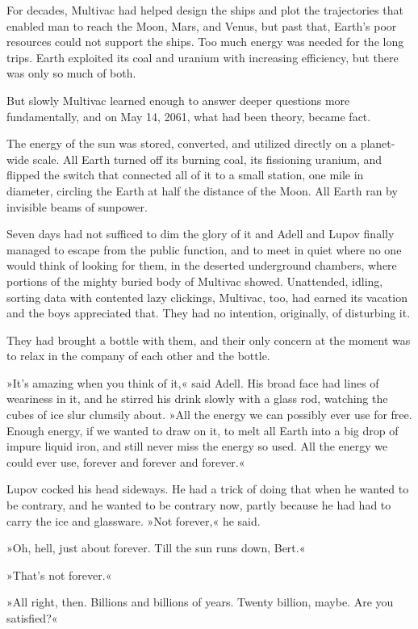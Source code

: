 \documentclass[11pt,twocolumn,paper=a5,pagesize,twoside]{scrartcl}
\newcommand{\q}[1]{»#1«}
\begin{document}
For decades, Multivac had helped design the ships and plot the trajectories
that enabled man to reach the Moon, Mars, and Venus, but past that, 
Earth's poor resources could not support the ships. Too much energy was 
needed for the long trips. Earth exploited its coal and uranium with 
increasing efficiency, but there was only so much of both.

But slowly Multivac learned enough to answer deeper questions more 
fundamentally, and on May 14, 2061, what had been theory, became fact.

The energy of the sun was stored, converted, and utilized directly on a
planet-wide scale. All Earth turned off its burning coal, its 
fissioning uranium, and flipped the switch that connected all of it to
a small station, one mile in diameter, circling the Earth at half the 
distance of the Moon. All Earth ran by invisible beams of sunpower.

Seven days had not sufficed to dim the glory of it and Adell and Lupov 
finally managed to escape from the public function, and to meet in quiet 
where no one would think of looking for them, in the deserted underground 
chambers, where portions of the mighty buried body of Multivac showed. 
Unattended, idling, sorting data with contented lazy clickings, Multivac, 
too, had earned its vacation and the boys appreciated that. They had no 
intention, originally, of disturbing it.

They had brought a bottle with them, and their only concern at the moment 
was to relax in the company of each other and the bottle.

\q{It's amazing when you think of it,} said Adell. His broad face had lines 
of weariness in it, and he stirred his drink slowly with a glass rod, 
watching the cubes of ice slur clumsily about. 
\q{All the energy we can possibly ever use for free. Enough energy, if we 
wanted to draw on it, to melt all Earth into a big drop of impure liquid 
iron, and still never miss the energy so used. All the energy we could ever
use, forever and forever and forever.}

Lupov cocked his head sideways. He had a trick of doing that when he wanted 
to be contrary, and he wanted to be contrary now, partly because he had had 
to carry the ice and glassware. \q{Not forever,} he said.

\q{Oh, hell, just about forever. Till the sun runs down, Bert.}

\q{That's not forever.}

\q{All right, then. Billions and billions of years. Twenty billion, maybe. 
Are you satisfied?}
\end{document}
